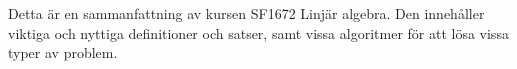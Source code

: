 Detta är en sammanfattning av kursen SF1672 Linjär algebra. Den innehåller viktiga och nyttiga definitioner och satser, samt vissa algoritmer för att lösa vissa typer av problem.